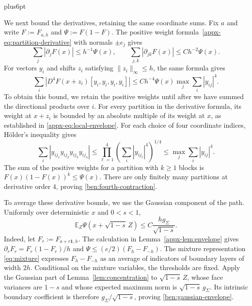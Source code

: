 \documentclass[11pt,letterpaper,twoside,leqno]{article}
\makeatletter
\theoremstyle{bookplain}
\theoremstyle{bookremark}
\renewenvironment{proof}[1][\proofname]{\par
  \pushQED{\qed}\normalfont\topsep6pt plus6pt\relax
  \trivlist\item[\hskip\labelsep\bfseries #1\@addpunct{.}]\ignorespaces
}{\popQED\endtrivlist\@endpefalse}
\newcommand{\E}{\mathbb E}
\makeatother
\begin{document}
\begin{proof}[Proof of Lemma~\ref{ben:comparison}]
We next bound the derivatives, retaining the same coordinate sums.
Fix $a$ and write $F:=F_{a,h}$ and $\Psi:=F(1-F)$.
The positive weight formula~\eqref{appx-eq:partition-derivative}
with normals $\pm e_j$ gives
\[
 \sum_j|\partial_jF(x)|\le h^{-1}\Psi(x),\qquad
 \sum_{j,k}|\partial_{jk}F(x)|\le Ch^{-2}\Psi(x).
\]
For vectors $y_i$ and shifts $z_i$ satisfying
$\|z_i\|_\infty\le h$, the same formula gives
\begin{equation}\label{ben:fourth-contraction}
 \sum_i|D^4F(x+z_i)[y_i,y_i,y_i,y_i]|
 \le Ch^{-4}\Psi(x)\max_j\sum_i|y_{ij}|^4.
\end{equation}
To obtain this bound, we retain the positive weights until after
we have summed the directional products over $i$. For every partition in the
derivative formula, its weight at $x+z_i$ is bounded by an
absolute multiple of its weight at $x$, as established in
\eqref{appx-eq:local-envelope}. For each choice of four coordinate
indices, H\"older's inequality gives
\[
 \sum_i|y_{ij_1}y_{ij_2}y_{ij_3}y_{ij_4}|
 \le\prod_{\ell=1}^4
       \left(\sum_i|y_{ij_\ell}|^4\right)^{1/4}
 \le\max_j\sum_i|y_{ij}|^4.
\]
The sum of the positive weights for a partition with $k\ge1$
blocks is $F(x)(1-F(x))^k\le\Psi(x)$. There are only finitely
many partitions at derivative order $4$, proving
\eqref{ben:fourth-contraction}.

To average these derivative bounds, we use the Gaussian component
of the path. Uniformly over deterministic $x$ and $0<s<1$,
\begin{equation}\label{ben:gaussian-envelope}
 \E_Z\Psi(x+\sqrt{1-s}\,Z)
 \le C\frac{hg_\Sigma}{\sqrt{1-s}}.
\end{equation}
Indeed, let $F_r:=F_{a+r\mathbf1,h}$. The calculation in
Lemma~\ref{appx-lem:envelope} gives
$\partial_rF_r=F_r(1-F_r)/h$ and
$\Psi\le(e/2)(F_h-F_{-h})$. The mixture representation
\eqref{eq:mixture} expresses $F_h-F_{-h}$ as an average of
indicators of boundary layers of width $2h$. Conditional on the
mixture variables, the thresholds are fixed. Apply the Gaussian
part of Lemma~\ref{lem:concentration} to $\sqrt{1-s}\,Z$,
whose face variances are $1-s$ and whose expected maximum norm
is $\sqrt{1-s}\,g_\Sigma$. Its intrinsic boundary coefficient
is therefore $g_\Sigma/\sqrt{1-s}$, proving
\eqref{ben:gaussian-envelope}.


\end{proof}
\end{document}
